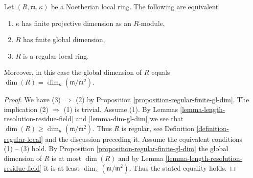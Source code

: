 \begin{proposition}
\label{proposition-finite-gl-dim-regular}
Let $(R, \mathfrak m, \kappa)$ be a Noetherian local ring.
The following are equivalent
\begin{enumerate}
\item $\kappa$ has finite projective dimension as an $R$-module,
\item $R$ has finite global dimension,
\item $R$ is a regular local ring.
\end{enumerate}
Moreover, in this case the global dimension of $R$ equals
$\dim(R) = \dim_\kappa(\mathfrak m/\mathfrak m^2)$.
\end{proposition}

\begin{proof}
We have (3) $\Rightarrow$ (2) by
Proposition \ref{proposition-regular-finite-gl-dim}.
The implication (2) $\Rightarrow$ (1) is trivial.
Assume (1). By Lemmas \ref{lemma-length-resolution-residue-field}
and \ref{lemma-dim-gl-dim} we see that
$\dim(R) \geq \dim_\kappa(\mathfrak m /\mathfrak m^2)$.
Thus $R$ is regular, see Definition
\ref{definition-regular-local} and the discussion preceding it.
Assume the equivalent conditions (1) -- (3) hold.
By Proposition \ref{proposition-regular-finite-gl-dim}
the global dimension of $R$ is at most $\dim(R)$ and by
Lemma \ref{lemma-length-resolution-residue-field}
it is at least $\dim_\kappa(\mathfrak m/\mathfrak m^2)$.
Thus the stated equality holds.
\end{proof}